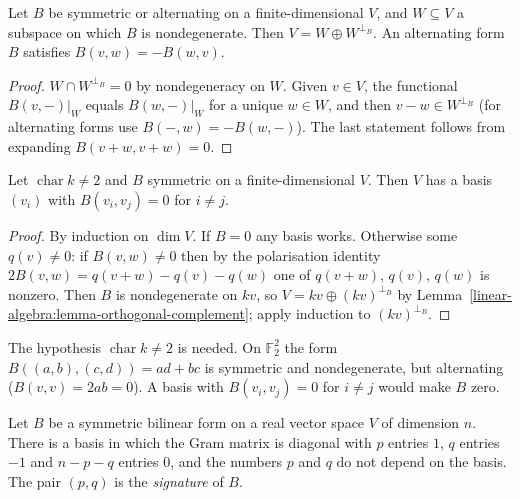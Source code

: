 \begin{lemma}\label{linear-algebra:lemma-orthogonal-complement}
Let $B$ be symmetric or alternating on a finite-dimensional $V$, and $W \subseteq V$ a subspace on which $B$
is nondegenerate. Then $V = W \oplus W^{\perp_B}$. An alternating form $B$ satisfies $B(v, w) = -B(w, v)$.
\end{lemma}

\begin{proof}
$W \cap W^{\perp_B} = 0$ by nondegeneracy on $W$. Given $v \in V$, the functional $B(v, -)|_W$ equals
$B(w, -)|_W$ for a unique $w \in W$, and then $v - w \in W^{\perp_B}$ (for alternating forms use
$B(-, w) = -B(w, -)$). The last statement follows from expanding $B(v + w, v + w) = 0$.
\end{proof}

\begin{theorem}\label{linear-algebra:theorem-orthogonal-basis}
Let $\operatorname{char} k \neq 2$ and $B$ symmetric on a finite-dimensional $V$. Then $V$ has a basis
$(v_i)$ with $B(v_i, v_j) = 0$ for $i \neq j$.
\end{theorem}

\begin{proof}
By induction on $\dim V$. If $B = 0$ any basis works. Otherwise some $q(v) \neq 0$: if $B(v, w) \neq 0$ then
by the polarisation identity $2B(v, w) = q(v + w) - q(v) - q(w)$ one of $q(v + w)$, $q(v)$, $q(w)$ is
nonzero. Then $B$ is nondegenerate on $kv$, so $V = kv \oplus (kv)^{\perp_B}$ by
Lemma~\ref{linear-algebra:lemma-orthogonal-complement}; apply induction to $(kv)^{\perp_B}$.
\end{proof}

\begin{counterexample}\label{linear-algebra:counterexample-char-two}
The hypothesis $\operatorname{char} k \neq 2$ is needed. On $\mathbb{F}_2^2$ the form
$B((a, b), (c, d)) = ad + bc$ is symmetric and nondegenerate, but alternating
($B(v, v) = 2ab = 0$). A basis with $B(v_i, v_j) = 0$ for $i \neq j$ would make $B$ zero.
\end{counterexample}

\begin{theorem}\label{linear-algebra:theorem-sylvester}
Let $B$ be a symmetric bilinear form on a real vector space $V$ of dimension $n$. There is a basis in which
the Gram matrix is diagonal with $p$ entries $1$, $q$ entries $-1$ and $n - p - q$ entries $0$, and the
numbers $p$ and $q$ do not depend on the basis. The pair $(p, q)$ is the \emph{signature} of $B$.
\end{theorem}

